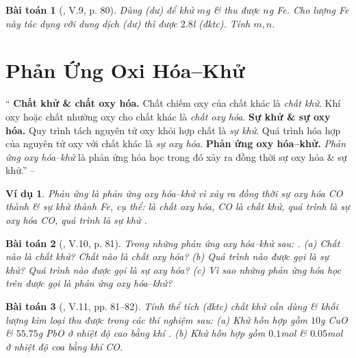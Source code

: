 \documentclass{article}
\newtheorem{baitoan}{Bài toán}
\newtheorem{vidu}{Ví dụ}
\begin{document}
\begin{baitoan}[\cite{Truong_BTNC_Hoa_Hoc_8_2022}, V.9, p. 80]
	Dùng \emph{} (dư) để khử $m$\emph{g} \emph{}  \& thu được $n$\emph{g Fe}. Cho lượng \emph{Fe} này tác dụng với dung dịch \emph{} (dư) thì được $2.8$\emph{l } (đktc). Tính $m,n$.
\end{baitoan}


\section{Phản Ứng Oxi Hóa--Khử}
`` \textbf{Chất khử \& chất oxy hóa.} Chất chiếm oxy của chất khác là \textit{chất khử}. Khí oxy hoặc chất nhường oxy cho chất khác là \textit{chất oxy hóa}.  \textbf{Sự khử \& sự oxy hóa.} Quy trình tách nguyên tử oxy khỏi hợp chất là \textit{sự khử}. Quá trình hóa hợp của nguyên tử oxy với chất khác là \textit{sự oxy hóa}.  \textbf{Phản ứng oxy hóa--khử.} \textit{Phản ứng oxy hóa--khử} là phản ứng hóa học trong đó xảy ra đồng thời sự oxy hóa \& sự khử.'' -- \cite[Chap. 5, \S2, pp. 80--81]{Truong_BTNC_Hoa_Hoc_8_2022}

\begin{vidu}
	Phản ứng \emph{} là \emph{phản ứng oxy hóa--khử} vì xảy ra đồng thời sự oxy hóa \emph{CO} thành \emph{} \& sự khử \emph{} thành \emph{Fe}, cụ thể: \emph{} là \emph{chất oxy hóa}, \emph{CO} là \emph{chất khử}, quá trình \emph{} là \emph{sự oxy hóa CO}, quá trình \emph{} là \emph{sự khử }.
\end{vidu}

\begin{baitoan}[\cite{Truong_BTNC_Hoa_Hoc_8_2022}, V.10, p. 81]
	Trong những phản ứng oxy hóa--khử sau: \emph{}. (a) Chất nào là chất khử? Chất nào là chất oxy hóa? (b) Quá trình nào được gọi là sự khử? Quá trình nào được gọi là sự oxy hóa? (c) Vì sao những phản ứng hóa học trên được gọi là phản ứng oxy hóa--khử? 
\end{baitoan}

\begin{baitoan}[\cite{Truong_BTNC_Hoa_Hoc_8_2022}, V.11, pp. 81--82]
	Tính thể tích (đktc) chất khử cần dùng \& khối lượng kim loại thu được trong các thí nghiệm sau: (a) Khử hỗn hợp gồm $10$\emph{g CuO} \& $55.75$\emph{g PbO} ở nhiệt độ cao bằng khí \emph{}. (b) Khử hỗn hợp gồm $0.1$\emph{mol } \& $0.05$\emph{mol } ở nhiệt độ coa bằng khí \emph{CO}.
\end{baitoan}
\end{document}
